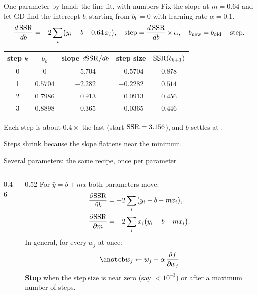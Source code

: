 \begin{frame}{One parameter by hand: the line fit, with numbers}
  \small
  Fix the slope at $m = 0.64$ and let GD find the intercept $b$, starting from $b_0 = 0$ with learning rate $\alpha = 0.1$.
  \[
    \frac{d\,\mathrm{SSR}}{db} = -2\sum_{i}\bigl(y_i - b - 0.64\,x_i\bigr),\quad
    \text{step} = \frac{d\,\mathrm{SSR}}{db}\times\alpha,\quad b_{\text{new}} = b_{\text{old}} - \text{step}.
  \]
  \centering\footnotesize
  \begin{tabular}{@{}c c c c c@{}}
    \toprule
    step $k$ & $b_k$ & slope $d\mathrm{SSR}/db$ & step size & $\mathrm{SSR}(b_{k+1})$ \\
    \midrule
    0 & $0$ & $-5.704$ & $-0.5704$ & $0.878$ \\
    1 & $0.5704$ & $-2.282$ & $-0.2282$ & $0.514$ \\
    2 & $0.7986$ & $-0.913$ & $-0.0913$ & $0.456$ \\
    3 & $0.8898$ & $-0.365$ & $-0.0365$ & $0.446$ \\
    \bottomrule
  \end{tabular}

  \raggedright
  \vspace{4pt}
  Each step is about $0.4\times$ the last (start $\mathrm{SSR} = 3.156$), and $b$ settles at .\par
  Steps shrink because the slope flattens near the minimum.
\end{frame}

\begin{frame}{Several parameters: the same recipe, once per parameter}
  \begin{columns}[T]
    \begin{column}{0.46\textwidth}
      \centering
      \scalebox{0.9}{}
    \end{column}
    \begin{column}{0.52\textwidth}
      \small
      For $\hat y = b + mx$ both parameters move:
      \begin{align*}
        \frac{\partial\mathrm{SSR}}{\partial b} &= -2\sum_i\bigl(y_i - b - m x_i\bigr),\\
        \frac{\partial\mathrm{SSR}}{\partial m} &= -2\sum_i x_i\bigl(y_i - b - m x_i\bigr).
      \end{align*}
      In general, for every $w_j$ at once:
      \[
        \ans{w_j \leftarrow w_j - \alpha\,\frac{\partial f}{\partial w_j}}
      \]
      \textbf{Stop} when the step size is near zero (say $<10^{-3}$) or after a maximum number of steps.
    \end{column}
  \end{columns}
\end{frame}

